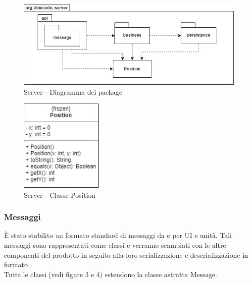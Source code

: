 	\begin{figure}[H]
		\centering
		\includegraphics[width=12cm]{img/server_package.png}
		\caption{Server - Diagramma dei package}
	\end{figure}

	\begin{figure}[H]
		\centering
		\includegraphics[width=4cm]{img/class_position.png}
		\caption{Server - Classe Position}
	\end{figure}

	\subsubsection{Messaggi}
		È stato stabilito un formato standard di messaggi da e per UI e unità. Tali messaggi sono rappresentati come classi  e verranno scambiati con le altre componenti del prodotto in seguito alla loro serializzazione e deserializzazione in formato .\\
		Tutte le classi (vedi figure 3 e 4) estendono la classe astratta Message.

